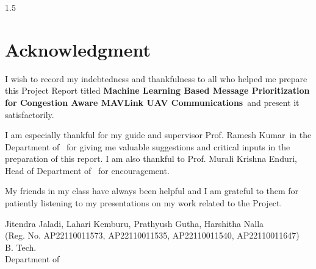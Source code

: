 \newpage
{}
\thispagestyle{empty}
\begin{spacing}{1.5}
%
\chapter*{Acknowledgment}




I wish to record my indebtedness and thankfulness 
to all who helped me prepare this Project Report titled 
{\bfseries Machine Learning Based Message Prioritization for Congestion Aware MAVLink UAV Communications\vtitle}\  and present it satisfactorily.

I am especially thankful for my 
guide and supervisor { Prof. Ramesh Kumar}\  in the Department of \vdept\  
for giving me valuable suggestions and 
critical inputs in the preparation of this report. 
I am also thankful to {Prof. Murali Krishna Enduri}, Head of Department of  \vdept\  
for encouragement. 

My friends in my class have always been 
helpful and I am grateful to them for 
patiently listening to my presentations on my work related to the Project. \\[1cm]



\begin{flushright}
Jitendra Jaladi, Lahari Kemburu, Prathyush Gutha, Harshitha Nalla\\
(Reg. No. AP22110011573, AP22110011535, AP22110011540, AP22110011647)\\
B. Tech.\\
Department of \vdept\\
\vcollege
\end{flushright}



\end{spacing}  